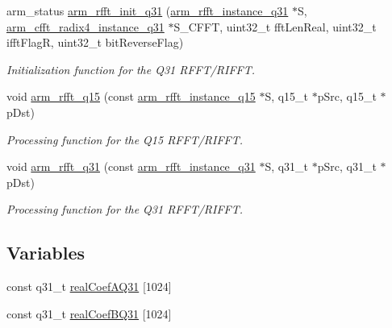 \begin{DoxyCompactItemize}
arm\-\_\-status \hyperlink{group___r_f_f_t___r_i_f_f_t_ga8b9c7f99f3c368c82048cd1899acbbd5}{arm\-\_\-rfft\-\_\-init\-\_\-q31} (\hyperlink{structarm__rfft__instance__q31}{arm\-\_\-rfft\-\_\-instance\-\_\-q31} $\ast$S, \hyperlink{structarm__cfft__radix4__instance__q31}{arm\-\_\-cfft\-\_\-radix4\-\_\-instance\-\_\-q31} $\ast$S\-\_\-\-C\-F\-F\-T, uint32\-\_\-t fft\-Len\-Real, uint32\-\_\-t ifft\-Flag\-R, uint32\-\_\-t bit\-Reverse\-Flag)
\begin{DoxyCompactList}\small\item\em Initialization function for the Q31 R\-F\-F\-T/\-R\-I\-F\-F\-T. \end{DoxyCompactList}\item 
void \hyperlink{group___r_f_f_t___r_i_f_f_t_ga00e615f5db21736ad5b27fb6146f3fc5}{arm\-\_\-rfft\-\_\-q15} (const \hyperlink{structarm__rfft__instance__q15}{arm\-\_\-rfft\-\_\-instance\-\_\-q15} $\ast$S, q15\-\_\-t $\ast$p\-Src, q15\-\_\-t $\ast$p\-Dst)
\begin{DoxyCompactList}\small\item\em Processing function for the Q15 R\-F\-F\-T/\-R\-I\-F\-F\-T. \end{DoxyCompactList}\item 
void \hyperlink{group___r_f_f_t___r_i_f_f_t_gabaeab5646aeea9844e6d42ca8c73fe3a}{arm\-\_\-rfft\-\_\-q31} (const \hyperlink{structarm__rfft__instance__q31}{arm\-\_\-rfft\-\_\-instance\-\_\-q31} $\ast$S, q31\-\_\-t $\ast$p\-Src, q31\-\_\-t $\ast$p\-Dst)
\begin{DoxyCompactList}\small\item\em Processing function for the Q31 R\-F\-F\-T/\-R\-I\-F\-F\-T. \end{DoxyCompactList}\end{DoxyCompactItemize}
\subsection*{Variables}
\begin{DoxyCompactItemize}
\item 
const q31\-\_\-t \hyperlink{group___r_f_f_t___r_i_f_f_t_gacebced5a9d92f1913a0afe2adef7a886}{real\-Coef\-A\-Q31} \mbox{[}1024\mbox{]}
\item 
const q31\-\_\-t \hyperlink{group___r_f_f_t___r_i_f_f_t_gaa3baee87ab9cc94a81d63135a004a3be}{real\-Coef\-B\-Q31} \mbox{[}1024\mbox{]}
\end{DoxyCompactItemize}


